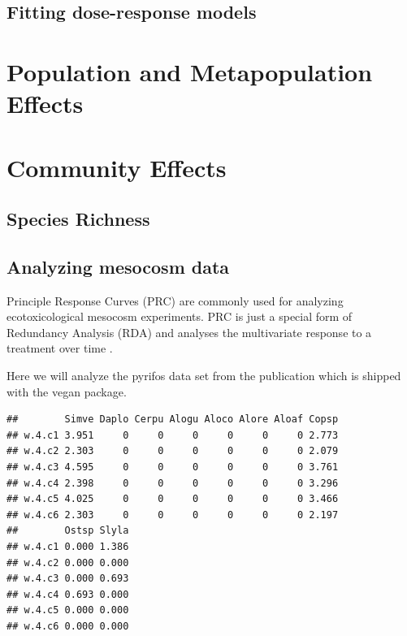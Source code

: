 \documentclass{tufte-book}\usepackage{knitr}
\begin{document}
\section{Fitting dose-response models}



\chapter{Population and Metapopulation Effects}



\chapter{Community Effects}

\section{Species Richness}

\section{Analyzing mesocosm data}
Principle Response Curves (PRC)\cite{van_den_brink_principal_1999} are commonly
used for analyzing ecotoxicological mesocosm experiments. PRC is just a 
special form of Redundancy Analysis (RDA) and analyses the multivariate response
to a treatment over time \cite{legendre_numerical_2013}.

Here we will analyze the pyrifos data set from the publication\cite{van_den_brink_principal_1999} which is shipped with the vegan package.

\begin{knitrout}
\color{fgcolor}\begin{kframe}
\begin{alltt}
\hlstd{(pyrifos[,} \hlstd{(}\hlopt{:}\hlstd{)])}
\end{alltt}
\begin{verbatim}
##        Simve Daplo Cerpu Alogu Aloco Alore Aloaf Copsp
## w.4.c1 3.951     0     0     0     0     0     0 2.773
## w.4.c2 2.303     0     0     0     0     0     0 2.079
## w.4.c3 4.595     0     0     0     0     0     0 3.761
## w.4.c4 2.398     0     0     0     0     0     0 3.296
## w.4.c5 4.025     0     0     0     0     0     0 3.466
## w.4.c6 2.303     0     0     0     0     0     0 2.197
##        Ostsp Slyla
## w.4.c1 0.000 1.386
## w.4.c2 0.000 0.000
## w.4.c3 0.000 0.693
## w.4.c4 0.693 0.000
## w.4.c5 0.000 0.000
## w.4.c6 0.000 0.000
\end{verbatim}
\end{kframe}
\end{knitrout}
\end{document}
